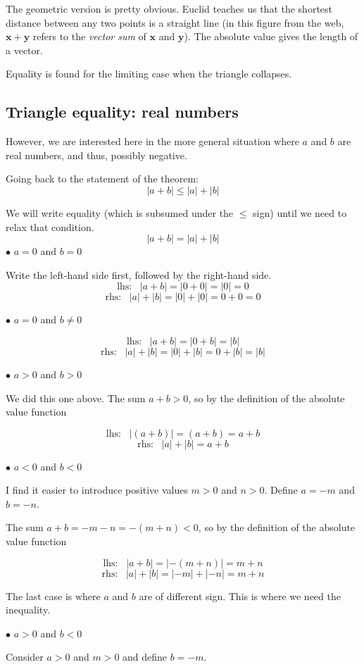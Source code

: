 \documentclass[11pt, oneside]{article}   	%
\begin{document}
The geometric version is pretty obvious.  Euclid teaches us that the shortest distance between any two points is a straight line (in this figure from the web, $\mathbf{x + y}$ refers to the \emph{vector sum} of $\mathbf{x}$ and $\mathbf{y}$).  The absolute value gives the length of a vector.

Equality is found for the limiting case when the triangle collapses.
\subsection*{Triangle equality:  real numbers}
However, we are interested here in the more general situation where $a$ and $b$ are real numbers, and thus, possibly negative. 

Going back to the statement of the theorem:
\[ |a + b| \le |a| + |b| \]

We will write equality (which is subsumed under the $\le$ sign) until we need to relax that condition.
\[ |a + b| = |a| + |b| \]
$\bullet$  $a = 0$ and $b = 0$

Write the left-hand side first, followed by the right-hand side.
\[ \text{lhs}: \ \ \  |a + b| = |0 + 0| = |0| = 0 \]
\[ \text{rhs}: \ \ \  |a| + |b| = |0| + |0| = 0 + 0 = 0 \]

$\bullet$  $a = 0$ and $b \ne 0$

\[ \text{lhs}: \ \ \  |a + b| = |0 + b| = |b| \]
\[ \text{rhs}: \ \ \  |a| + |b| = |0| + |b| = 0 + |b| = |b| \]

$\bullet$  $a > 0$ and $b > 0$

We did this one above.  The sum $a + b > 0$, so by the definition of the absolute value function

\[ \text{lhs}: \ \ \  |(a + b)| = (a + b) = a + b \]
\[ \text{rhs}: \ \ \  |a| + |b| = a + b \]

$\bullet$  $a < 0$ and $b < 0$

I find it easier to introduce positive values $m > 0$ and $n > 0$.  Define $a = -m$ and $b = -n$.

The sum $a + b = -m -n = -(m + n)  < 0$, so by the definition of the absolute value function

\[ \text{lhs}: \ \ \  |a + b| = |-(m+n)|  = m+n \]
\[ \text{rhs}: \ \ \  |a| + |b| = |-m| + |-n| = m+n \]

The last case is where $a$ and $b$ are of different sign.  This is where we need the inequality.

$\bullet$  $a > 0$ and $b < 0$

Consider $a > 0$ and $m > 0$ and define $b = -m$.
  
\end{document}

